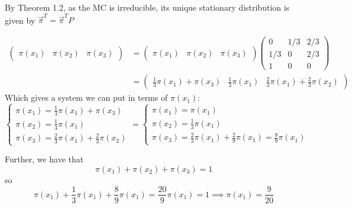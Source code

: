 \documentclass[11pt,letterpaper, leqno]{article}
\numberwithin{equation}{section}
\numberwithin{theorem}{section}
\numberwithin{lemma}{section}
\numberwithin{corollary}{section}
\numberwithin{definition}{section}
\numberwithin{proposition}{section}
\numberwithin{remark}{section}
\numberwithin{example}{section}
\begin{document}
\begin{enumerate}
\begin{enumerate}
            \color{blue}
                By Theorem 1.2, as the MC is irreducible, its unique stationary distribution is given by $\vec \pi^T = \vec \pi^T P$
                
                \begin{align*}
                    \begin{pmatrix}
                        \pi(x_1) & \pi(x_2) & \pi(x_3)
                    \end{pmatrix} &= \begin{pmatrix}
                        \pi(x_1) & \pi(x_2) & \pi(x_3)
                    \end{pmatrix}\begin{pmatrix}
                        0 & 1/3 & 2/3\\
                        1/3 & 0 & 2/3\\
                        1 & 0 & 0
                    \end{pmatrix}\\
                    &= \begin{pmatrix}
                        \frac{1}{3}\pi(x_1) + \pi(x_3) & \frac{1}{3}\pi(x_1) & \frac{2}{3}\pi(x_1) + \frac{2}{3}\pi(x_2)
                    \end{pmatrix}
                \end{align*}
                Which gives a system we can put in terms of $\pi(x_1)$:
                \[\begin{cases}
                    \pi(x_1) = \frac{1}{3}\pi(x_1) + \pi(x_3)\\
                    \pi(x_2) = \frac{1}{3}\pi(x_1)\\
                    \pi(x_3) = \frac{2}{3}\pi(x_1) + \frac{2}{3}\pi(x_2)
                \end{cases} = \begin{cases}
                    \pi(x_1) = \pi(x_1)\\
                    \pi(x_2) = \frac{1}{3}\pi(x_1)\\
                    \pi(x_3) = \frac{2}{3}\pi(x_1) + \frac{2}{9}\pi(x_1) = \frac{8}{9}\pi(x_1)
                \end{cases}\]
               
                Further, we have that 
                \[\pi(x_1) + \pi(x_2) + \pi(x_3) = 1\]
                so 
                \[\pi(x_1) + \frac{1}{3}\pi(x_1) + \frac{8}{9}\pi(x_1) = \frac{20}{9}\pi(x_1) = 1 \implies \pi(x_1) = \frac{9}{20} \]
                

\end{enumerate}
\end{enumerate}
\end{document}
